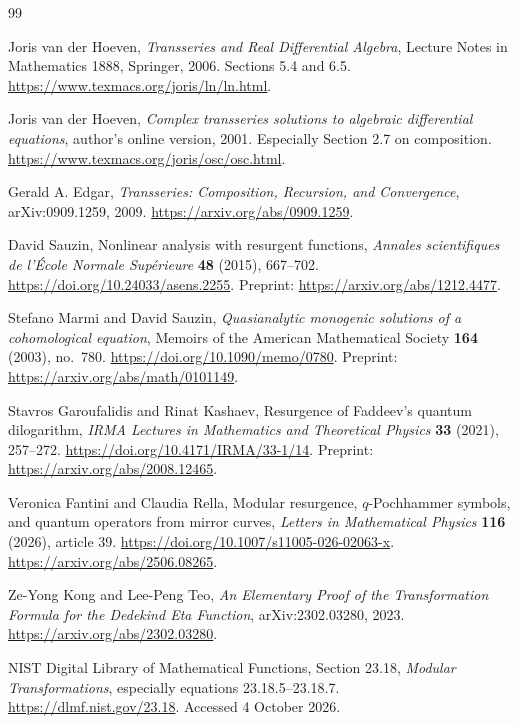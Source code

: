 \clearpage
\begin{thebibliography}{99}

Joris van der Hoeven,
\emph{Transseries and Real Differential Algebra},
Lecture Notes in Mathematics 1888, Springer, 2006.
Sections 5.4 and 6.5.
\url{https://www.texmacs.org/joris/ln/ln.html}.

Joris van der Hoeven,
\emph{Complex transseries solutions to algebraic differential equations},
author's online version, 2001.
Especially Section 2.7 on composition.
\url{https://www.texmacs.org/joris/osc/osc.html}.

Gerald A. Edgar,
\emph{Transseries: Composition, Recursion, and Convergence},
arXiv:0909.1259, 2009.
\url{https://arxiv.org/abs/0909.1259}.

David Sauzin,
Nonlinear analysis with resurgent functions,
\emph{Annales scientifiques de l'\'Ecole Normale Sup\'erieure}
\textbf{48} (2015), 667--702.
\url{https://doi.org/10.24033/asens.2255}.
Preprint: \url{https://arxiv.org/abs/1212.4477}.

Stefano Marmi and David Sauzin,
\emph{Quasianalytic monogenic solutions of a cohomological equation},
Memoirs of the American Mathematical Society
\textbf{164} (2003), no.~780.
\url{https://doi.org/10.1090/memo/0780}.
Preprint: \url{https://arxiv.org/abs/math/0101149}.

Stavros Garoufalidis and Rinat Kashaev,
Resurgence of Faddeev's quantum dilogarithm,
\emph{IRMA Lectures in Mathematics and Theoretical Physics}
\textbf{33} (2021), 257--272.
\url{https://doi.org/10.4171/IRMA/33-1/14}.
Preprint: \url{https://arxiv.org/abs/2008.12465}.

Veronica Fantini and Claudia Rella,
Modular resurgence, \(q\)-Pochhammer symbols, and quantum operators
from mirror curves,
\emph{Letters in Mathematical Physics} \textbf{116} (2026), article 39.
\url{https://doi.org/10.1007/s11005-026-02063-x}.
\url{https://arxiv.org/abs/2506.08265}.

Ze-Yong Kong and Lee-Peng Teo,
\emph{An Elementary Proof of the Transformation Formula for the
Dedekind Eta Function},
arXiv:2302.03280, 2023.
\url{https://arxiv.org/abs/2302.03280}.

NIST Digital Library of Mathematical Functions,
Section 23.18, \emph{Modular Transformations},
especially equations 23.18.5--23.18.7.
\url{https://dlmf.nist.gov/23.18}.
Accessed 4 October 2026.


\end{thebibliography}
